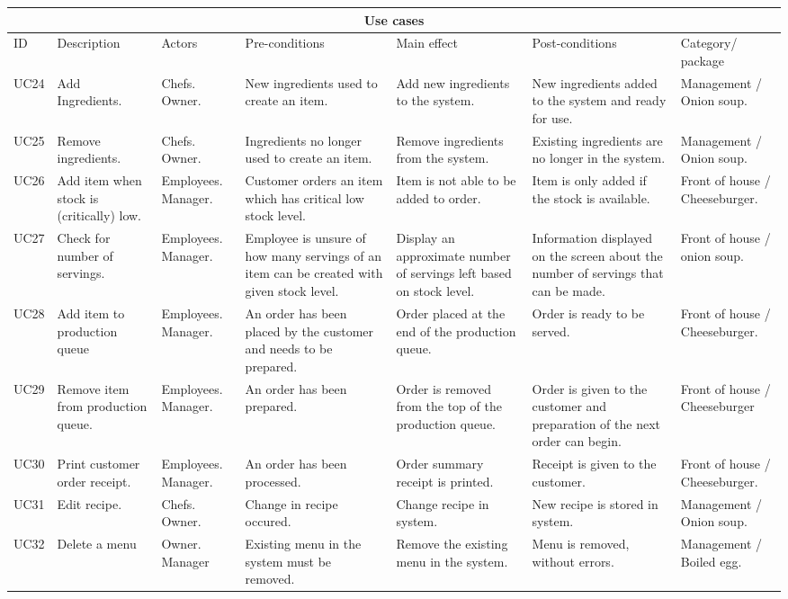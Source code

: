\begin{tabularx}{\linewidth}{|X|X|X|X|X|X|X|}
\hline
\multicolumn{7}{c}{ Use cases } \\
\hline
ID & Description & Actors & Pre-conditions & Main effect & Post-conditions & Category/ package \\
\hline
UC24 & Add Ingredients. & Chefs. Owner. & New ingredients used to create an item. & Add new ingredients to the system. & New ingredients added to the system and ready for use. & Management / Onion soup. \\
\hline
UC25 & Remove ingredients. & Chefs. Owner. & Ingredients no longer used to create an item. & Remove ingredients from the system. & Existing ingredients are no longer in the system. & Management / Onion soup. \\
\hline
UC26 & Add item when stock is (critically) low. & Employees. Manager. & Customer orders an item which has critical low stock level. & Item is not able to be added to order. & Item is only added if the stock is available. & Front of house / Cheeseburger. \\
\hline
UC27 & Check for number of servings. & Employees. Manager. & Employee is unsure of how many servings of an item can be created with given stock level. & Display an approximate number of servings left based on stock level. & Information displayed on the screen about the number of servings that can be made. & Front of house / onion soup. \\
\hline
UC28 & Add item to production queue & Employees. Manager. & An order has been placed by the customer and needs to be prepared. & Order placed at the end of the production queue. & Order is ready to be served. & Front of house / Cheeseburger. \\
\hline
UC29 & Remove item from production queue. & Employees. Manager. & An order has been prepared. & Order is removed from the top of the production queue. & Order is given to the customer and preparation of the next order can begin. & Front of house / Cheeseburger \\
\hline
UC30 & Print customer order receipt. & Employees. Manager. & An order has been processed. & Order summary receipt is printed. & Receipt is given to the customer. & Front of house / Cheeseburger. \\
\hline
UC31 & Edit recipe. & Chefs. Owner. & Change in recipe occured. & Change recipe in system. & New recipe is stored in system. & Management / Onion soup. \\
\hline
UC32 & Delete a menu & Owner. Manager & Existing menu in the system must be removed. & Remove the existing menu in the system. & Menu is removed, without errors. & Management / Boiled egg. \\
\hline
\end{tabularx}